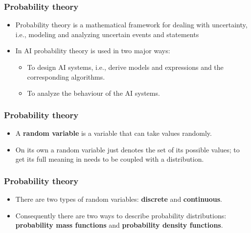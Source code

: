 \documentclass[notes]{beamer}          %
\newif\iffull
\begin{document}
\begin{frame}
\frametitle{Probability theory}
\begin{itemize}
    \item Probability theory is a mathematical framework for dealing with uncertainty, i.e., modeling and analyzing uncertain events and statements
    \item In AI probability theory is used in two major ways:
        \begin{itemize}
            \item To design AI systems, i.e., derive models and expressions and the corresponding algorithms.
            \item To analyze the behaviour of the AI systems.
        \end{itemize}

\end{itemize}

\end{frame}

\begin{frame}
\frametitle{Probability theory}
    \begin{itemize}
        \item A {\bf random variable} is a variable that can take values randomly.
        \iffull
        \item We will denote random variables with plain (ordinary text) typeface and their values with standard math typeface\\
        for example, if the random variable is denoted as x its values can be $x_1$ and $x_2$.
        \item A vector-valued random variable is denoted with bold typeface, e.g. {\bf x}.
        \fi
        \item On its own a random variable just denotes the set of its possible values; to get its full meaning in needs to be coupled with a distribution.
    \end{itemize}
\end{frame}


\begin{frame}
\frametitle{Probability theory}
    \begin{itemize}
        \item There are two types of random variables: {\bf discrete} and {\bf continuous}.
        \item Consequently there are two ways to describe probability distributions: {\bf probability mass functions} and {\bf probability density functions}.
    \end{itemize}
\end{frame}
\end{document}
